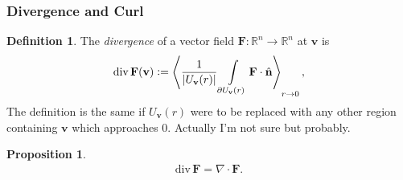 \documentclass{article}
\newcommand{\vc}{\vcentcolon}
\theoremstyle{definition}
\newtheorem{defn}{Definition}[subsubsection]
\newtheorem{prop}{Proposition}[subsubsection]
\begin{document}
\subsubsection{Divergence and Curl}
\begin{defn}
	The \emph{divergence} of a vector field $\mathbf{F}:\mathbb{R}^n\rightarrow\mathbb{R}^n$ at $\mathbf{v}$ is
	\begin{align*}
		\text{div}\,\mathbf{F}(\mathbf{v})\vc=\left\langle\frac{1}{\lvert U_{\mathbf{v}}(r)\rvert}\int\limits_{\partial U_{\mathbf{v}}(r)}\mathbf{F}\cdot\hat{\mathbf{n}}\right\rangle_{r\rightarrow0},
	\end{align*}
	The definition is the same if $U_{\mathbf{v}}(r)$ were to be replaced with any other region containing $\mathbf{v}$ which approaches 0. Actually I'm not sure but probably.
\end{defn}
\begin{prop}
	\begin{align*}
		\text{div}\,\mathbf{F}=\nabla\cdot\mathbf{F}.
	\end{align*}
\end{prop}
\end{document}
